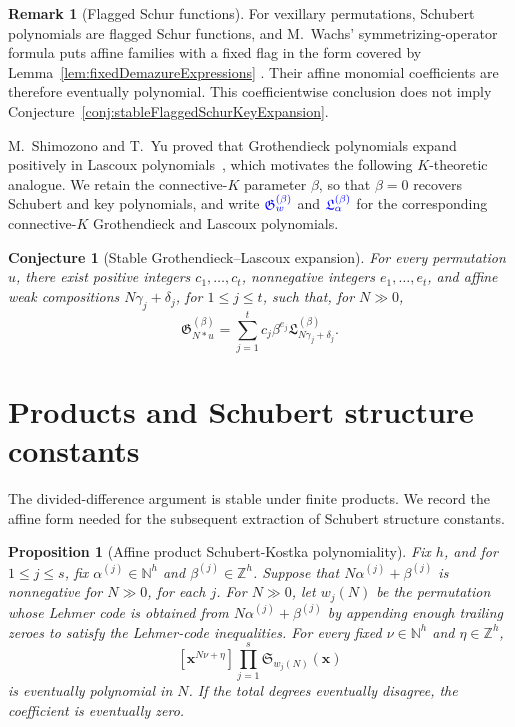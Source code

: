 \documentclass[11pt,reqno]{amsart}
\newtheorem{proposition}[theorem]{Proposition}
\newtheorem{conjecture}[theorem]{Conjecture}
\theoremstyle{definition}
\newtheorem{remark}[theorem]{Remark}
\newcommand{\setN}{\mathbb{N}}
\newcommand{\setZ}{\mathbb{Z}}
\newcommand{\xvec}{\mathbf{x}}
\newcommand{\schubertS}{\mathfrak{S}}
\newcommand{\stretchop}{\mathbin{\ast}}
\newcommand{\stretchperm}[2]{#1\stretchop #2}
\newcommand{\defin}[1]{%
  \relax\ifmmode%
  \textcolor{blue}{#1}%
  \else\textcolor{blue}{\emph{#1}}%
  \fi%
}
\begin{document}
\begin{remark}[Flagged Schur functions]
For vexillary permutations, Schubert polynomials are flagged Schur functions,
and M.~Wachs' symmetrizing-operator formula puts affine families with a fixed
flag in the form covered by Lemma~\ref{lem:fixedDemazureExpressions}
\cite{Wachs1985}.  Their affine monomial coefficients are therefore eventually
polynomial.  This coefficientwise conclusion does not imply
Conjecture~\ref{conj:stableFlaggedSchurKeyExpansion}.
\end{remark}

M.~Shimozono and T.~Yu proved that Grothendieck polynomials expand positively
in Lascoux polynomials~\cite{ShimozonoYu2021}, which motivates the following
\(K\)-theoretic analogue.  We retain the connective-\(K\) parameter \(\beta\),
so that \(\beta=0\) recovers Schubert and key polynomials, and write
\(\defin{\mathfrak G_w^{(\beta)}}\) and
\(\defin{\mathfrak L_\alpha^{(\beta)}}\) for the corresponding
connective-\(K\) Grothendieck and Lascoux polynomials.

\begin{conjecture}[Stable Grothendieck--Lascoux expansion]
\label{conj:stableGrothendieckLascouxExpansion}
For every permutation \(u\), there exist positive integers \(c_1,\dotsc,c_t\),
nonnegative integers \(e_1,\dotsc,e_t\), and affine weak compositions
\(N\gamma_j+\delta_j\), for \(1\leq j\leq t\), such that, for \(N\gg0\),
\[
\mathfrak G_{\stretchperm{N}{u}}^{(\beta)}
=
\sum_{j=1}^t
c_j\beta^{e_j}\mathfrak L_{N\gamma_j+\delta_j}^{(\beta)}.
\]
\end{conjecture}

\section{Products and Schubert structure constants}
\label{sec:products}

The divided-difference argument is stable under finite products.  We record
the affine form needed for the subsequent extraction of Schubert structure
constants.

\begin{proposition}[Affine product Schubert-Kostka polynomiality]
\label{prop:productSchubertKostka}
Fix \(h\), and for \(1\leq j\leq s\), fix
\(\alpha^{(j)}\in\setN^h\) and \(\beta^{(j)}\in\setZ^h\).  Suppose that
\(N\alpha^{(j)}+\beta^{(j)}\) is nonnegative for \(N\gg0\), for each \(j\).
For \(N\gg0\), let \(w_j(N)\) be the permutation whose Lehmer code is obtained
from \(N\alpha^{(j)}+\beta^{(j)}\) by appending enough trailing zeroes to
satisfy the Lehmer-code inequalities.
For every fixed
\(\nu\in\setN^h\) and \(\eta\in\setZ^h\),
\[
[\xvec^{N\nu+\eta}]
\prod_{j=1}^s
\schubertS_{w_j(N)}(\xvec)
\]
is eventually polynomial in \(N\).  If the total degrees eventually disagree, the
coefficient is eventually zero.
\end{proposition}
\end{document}
